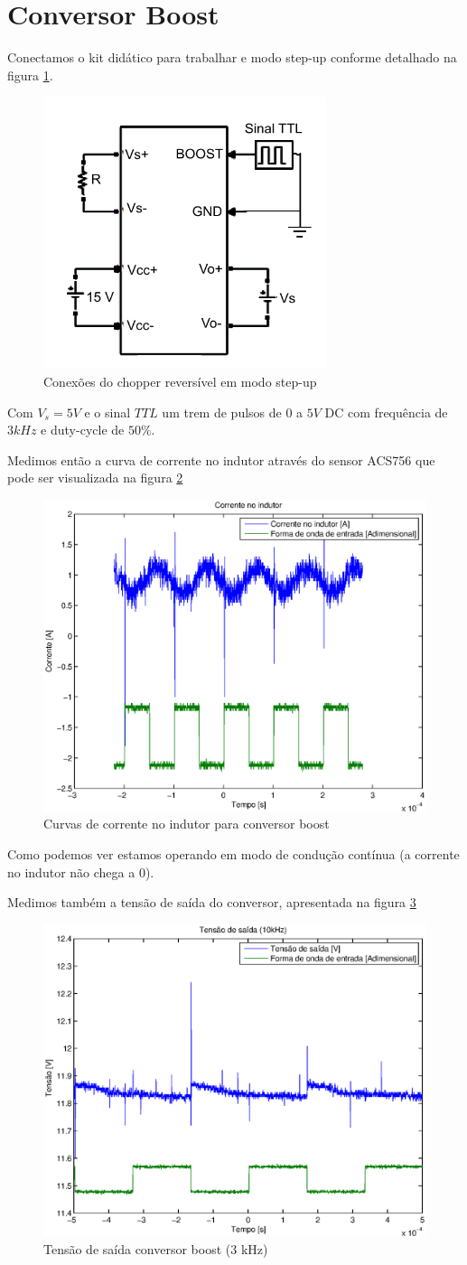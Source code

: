 \documentclass{article}
\begin{document}
\section{Conversor Boost}

Conectamos o kit didático para trabalhar e modo step-up conforme detalhado na figura \ref{fig:boesq}.
\begin{figure}[H]
	\centering
	\includegraphics[width=0.5\linewidth]{Dados/boost/esq}
	\caption{Conexões do chopper reversível em modo step-up \cite{bb:paiva}}
	\label{fig:boesq}
\end{figure}
Com $V_s = 5V$ e o sinal $TTL$ um trem de pulsos de $0$ a $5V$ DC com frequência de $3kHz$ e duty-cycle de $50\%$.

Medimos então a curva de corrente no indutor através do sensor ACS756 que pode ser visualizada na figura \ref{fig:boil}
\begin{figure}[H]
	\centering
	\includegraphics[width=0.5\linewidth]{Dados/boost/il}
	\caption{Curvas de corrente no indutor para conversor boost}
	\label{fig:boil}
\end{figure}
Como podemos ver estamos operando em modo de condução contínua (a corrente no indutor não chega a 0).

Medimos também a tensão de saída do conversor, apresentada na figura \ref{fig:bot3k}
\begin{figure}[H]
	\centering
	\includegraphics[width=0.5\linewidth]{Dados/boost/t3k}
	\caption{Tensão de saída conversor boost (3 kHz)}
	\label{fig:bot3k}
\end{figure}
\end{document}
